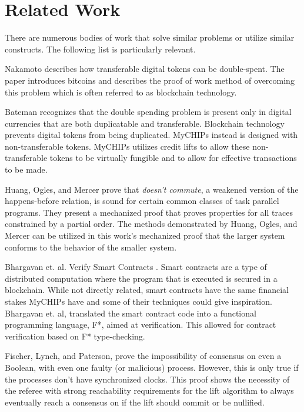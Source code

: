\documentclass[runningheads]{llncs}
\newif\ifcomments
\newcommand{\krs}[1]{\ifcomments\textcolor{blue}{krs: #1}\fi}
\begin{document}
\section{Related Work}
\krs{Need to add sections about other results that use conformance, as well as infinite state model checking}
There are numerous bodies of work that solve similar problems or utilize similar constructs. The following list is particularly relevant. 
 
 Nakamoto describes how transferable digital tokens can be double-spent. The paper introduces bitcoins and describes the proof of work method of overcoming this problem which is often referred to as blockchain technology. \cite{bitcoin} 

 Bateman recognizes that the double spending problem is present only in digital currencies that are both duplicatable and transferable. Blockchain technology prevents digital tokens from being duplicated. MyCHIPs instead is designed with non-transferable tokens. MyCHIPs utilizes credit lifts to allow these non-transferable tokens to be virtually fungible and to allow for effective transactions to be made. 
 
 Huang, Ogles, and Mercer prove that \emph{doesn't commute}, a weakened version of the happens-before relation, is sound for certain common classes of task parallel programs. They present a mechanized proof that proves properties for all traces constrained by a partial order. The methods demonstrated by Huang, Ogles, and Mercer can be utilized in this work's mechanized proof that the larger system conforms to the behavior of the smaller system. \cite{ben_DC}

 Bhargavan et. al. Verify Smart Contracts \cite{SmartContracts}. Smart contracts are a type of distributed computation where the program that is executed is secured in a blockchain. While not directly related, smart contracts have the same financial stakes MyCHIPs have and some of their techniques could give inspiration.  Bhargavan et. al, translated the smart contract code into a functional programming language, F*, aimed at verification. This allowed for contract verification based on F* type-checking.
 
 
 Fischer, Lynch, and Paterson,\cite{Fischer} prove the impossibility of consensus on even a Boolean, with even one faulty (or malicious) process. However, this is only true if the processes don't have synchronized clocks. This proof shows the necessity of the referee with strong reachability requirements for the lift algorithm to always eventually reach a consensus on if the lift should commit or be nullified.
 
\end{document}
